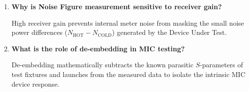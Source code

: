 \documentclass[12pt,a4paper]{article}
\newcommand{\Q}[1]{\textbf{#1}\par\noindent\ignorespaces}
\begin{document}
\begin{tcolorbox}[exambox, title={\textbf{Frequently Asked / Viva Questions}}]
\begin{enumerate}[topsep=0pt, label=\textbf{Q\arabic*.}, itemsep=5pt]
    \item \Q{Why is Noise Figure measurement sensitive to receiver gain?}
    High receiver gain prevents internal meter noise from masking the small noise power differences ($N_{\text{HOT}} - N_{\text{COLD}}$) generated by the Device Under Test.

    \item \Q{What is the role of de-embedding in MIC testing?}
    De-embedding mathematically subtracts the known parasitic $S$-parameters of test fixtures and launches from the measured data to isolate the intrinsic MIC device response.
  \end{enumerate}
\end{tcolorbox}
\end{document}
